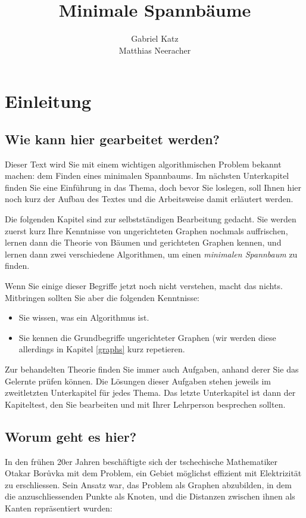 \documentclass[12pt]{report}
\title{Minimale Spannb\"{a}ume}
\author{Gabriel Katz\\ Matthias Neeracher}
\theoremstyle{break}
\begin{document}
\maketitle
\tableofcontents
\chapter{Einleitung}

\section{Wie kann hier gearbeitet werden?}

Dieser Text wird Sie mit einem wichtigen algorithmischen Problem
bekannt machen: dem Finden eines minimalen Spannbaums. Im n\"{a}chsten
Unterkapitel finden Sie eine Einf\"{u}hrung in das Thema, doch bevor
Sie loslegen, soll Ihnen hier noch kurz der Aufbau des Textes und die
Arbeitsweise damit erl\"{a}utert werden.

Die folgenden Kapitel sind zur selbstst\"{a}ndigen Bearbeitung
gedacht. Sie werden zuerst kurz Ihre Kenntnisse von ungerichteten
Graphen nochmals auffrischen, lernen dann die Theorie von B\"{a}umen
und gerichteten Graphen kennen, und lernen dann zwei verschiedene
Algorithmen, um einen \emph{minimalen Spannbaum} zu finden.
 
Wenn Sie einige dieser Begriffe jetzt noch nicht verstehen, macht das
nichts. Mitbringen sollten Sie aber die folgenden Kenntnisse:

\begin{itemize}
\item Sie wissen, was ein Algorithmus ist.
\item Sie kennen die Grundbegriffe ungerichteter Graphen (wir werden
  diese allerdings in Kapitel \ref{graphs} kurz repetieren.
\end{itemize}

Zur behandelten Theorie finden Sie immer auch Aufgaben, anhand derer
Sie das Gelernte pr\"{u}fen k\"{o}nnen. Die L\"{o}sungen dieser Aufgaben stehen
jeweils im zweitletzten Unterkapitel f\"{u}r jedes Thema. Das letzte
Unterkapitel ist dann der Kapiteltest, den Sie bearbeiten und mit
Ihrer Lehrperson besprechen sollten.

\section{Worum geht es hier?}

In den fr\"uhen 20er Jahren besch\"aftigte sich der tschechische
Mathematiker Otakar Bor\r{u}vka mit dem Problem, ein Gebiet
m\"{o}glichst effizient mit Elektrizit\"{a}t zu erschliessen. Sein
Ansatz war, das Problem als Graphen abzubilden, in dem die
anzuschliessenden Punkte als Knoten, und die Distanzen zwischen ihnen
als Kanten repr\"{a}sentiert wurden:
\end{document}
